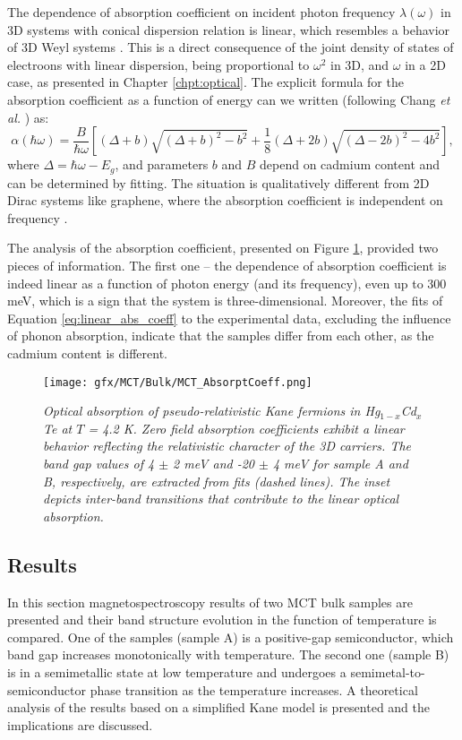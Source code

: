 \documentclass[titlepage,a4paper]{book}
\newcommand{\wciecie}{\quad\phantom{v}}
\begin{document}
The dependence of absorption coefficient on incident photon frequency $\lambda (\omega)$ in 3D systems with conical dispersion relation is linear, which resembles a behavior of 3D Weyl systems \cite{Malcolm_MCT}. This is a direct consequence of the joint density of states of electroons with linear dispersion, being proportional to $\omega^2$ in 3D, and $\omega$ in a 2D case, as presented in Chapter \ref{chpt:optical}. The explicit formula for the absorption coefficient as a function of energy can we written (following Chang \textit{et al.} \cite{Chang_MCT_bulk}) as:
\begin{equation}
\label{eq:linear_abs_coeff}
\alpha (\hbar\omega) = \frac{B}{\hbar\omega} \left[ (\Delta + b)\sqrt{(\Delta+b)^2-b^2} + \frac{1}{8}(\Delta+2b)\sqrt{(\Delta-2b)^2-4b^2}\right],
\end{equation}
where $\Delta = \hbar\omega - E_g$, and parameters $b$ and $B$ depend on cadmium content and can be determined by fitting. The situation is qualitatively different from 2D Dirac systems like graphene, where the absorption coefficient is independent on frequency \cite{Kuzmenko_MCTBulk}.

The analysis of the absorption coefficient, presented on Figure \ref{fig:Samples_MCT_AbsorptCoeff}, provided two pieces of information. The first one -- the dependence of absorption coefficient is indeed linear as a function of photon energy (and its frequency), even up to 300 meV, which is a sign that the system is three-dimensional. Moreover, the fits of Equation \ref{eq:linear_abs_coeff} to the experimental data, excluding the influence of phonon absorption, indicate that the samples differ from each other, as the cadmium content is different.

\begin{figure}[H]
	\centering
	\texttt{[image: gfx/MCT/Bulk/MCT\_AbsorptCoeff.png]}
	\vspace{-10pt}
	\caption{\textit{Optical absorption of pseudo-relativistic Kane fermions in Hg$_{1-x}$Cd$_x$Te at $T$ = 4.2 K. Zero field absorption coefficients exhibit a linear behavior reflecting the relativistic character of the 3D carriers. The band gap values of 4 $\pm$ 2 meV and -20 $\pm$ 4 meV for sample A and B, respectively, are extracted from fits (dashed lines). The inset depicts inter-band transitions that contribute to the linear optical absorption.}}	
\label{fig:Samples_MCT_AbsorptCoeff}
\end{figure} 

\subsection{Results}
\label{sec:MCT_bulk}
\wciecie
In this section magnetospectroscopy results of two MCT bulk samples are presented and their band structure evolution in the function of temperature is compared. One of the samples (sample A) is a positive-gap semiconductor, which band gap increases monotonically with temperature. The second one (sample B) is in a semimetallic state at low temperature and undergoes a semimetal-to-semiconductor phase transition as the temperature increases. A theoretical analysis of the results based on a simplified Kane model is presented and the implications are discussed.
\end{document}
